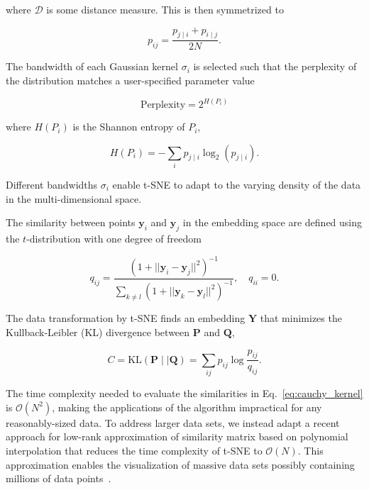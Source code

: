 \documentclass[runningheads]{llncs}
\begin{document}
\noindent where $\mathcal{D}$ is some distance measure. This is then symmetrized to

\begin{equation}
p_{ij} = \frac{p_{j \mid i} + p_{i \mid j}}{2N}.
\label{eq:symmetrize}
\end{equation}

The bandwidth of each Gaussian kernel $\sigma_i$ is selected such that the perplexity of the distribution matches a user-specified parameter value

\begin{equation}
\text{Perplexity} = 2^{H(P_i)}
\end{equation}

\noindent where $H(P_i)$ is the Shannon entropy of $P_i$,

\begin{equation}
H(P_i) = -\sum_i p_{j \mid i} \log_2 (p_{j \mid i}).
\end{equation}

\noindent Different bandwidths $\sigma_i$ enable t-SNE to adapt to the varying density of the data in the multi-dimensional space.

The similarity between points $\mathbf{y}_i$ and $\mathbf{y}_j$ in the embedding space are defined using the $t$-distribution with one degree of freedom

\begin{equation}
q_{ij} = \frac{\left ( 1 + || \mathbf{y}_i - \mathbf{y}_j ||^2 \right )^{-1}}
{\sum_{k \neq l}\left ( 1 + || \mathbf{y}_k - \mathbf{y}_l ||^2 \right )^{-1}},
\quad q_{ii} = 0.
\label{eq:cauchy_kernel}
\end{equation}

The data transformation by t-SNE finds an embedding $\mathbf{Y}$ that minimizes the Kullback-Leibler (KL) divergence between $\mathbf{P}$ and $\mathbf{Q}$,

\begin{equation}
C = \text{KL}(\mathbf{P} \mid \mid \mathbf{Q}) = \sum_{ij} p_{ij} \log \frac{p_{ij}}{q_{ij}}.
\label{eq:kl_divergence}
\end{equation}

The time complexity needed to evaluate the similarities in Eq.~\ref{eq:cauchy_kernel} is $\mathcal{O}(N^2)$, making the applications of the algorithm impractical for any reasonably-sized data. To address larger data sets, we instead adapt a recent approach for low-rank approximation of similarity matrix based on polynomial interpolation that reduces the time complexity of t-SNE to $\mathcal{O}(N)$. This approximation enables the visualization of massive data sets possibly containing millions of data points~\cite{fi_tsne}.
\end{document}
